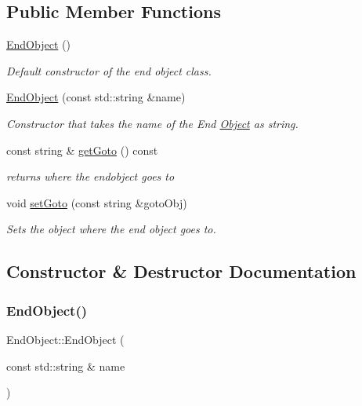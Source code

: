 \subsection*{Public Member Functions}
\begin{DoxyCompactItemize}
\item 
\mbox{\label{classEndObject_a3efa8c64e8a441d9a455cee8e0acf3cc}} 
\hyperlink{classEndObject_a3efa8c64e8a441d9a455cee8e0acf3cc}{End\+Object} ()
\begin{DoxyCompactList}\small\item\em Default constructor of the end object class. \end{DoxyCompactList}\item 
\hyperlink{classEndObject_a2b7de61a785ee056d8ee82cb7e545b95}{End\+Object} (const std\+::string \&name)
\begin{DoxyCompactList}\small\item\em Constructor that takes the name of the End \hyperlink{classObject}{Object} as string. \end{DoxyCompactList}\item 
const string \& \hyperlink{classEndObject_a24ff73b898d1fa9fa15b98f490bf6bbc}{get\+Goto} () const
\begin{DoxyCompactList}\small\item\em returns where the endobject goes to \end{DoxyCompactList}\item 
void \hyperlink{classEndObject_af2fd8ca8246a6891f72f44aacd55cba4}{set\+Goto} (const string \&goto\+Obj)
\begin{DoxyCompactList}\small\item\em Sets the object where the end object goes to. \end{DoxyCompactList}\end{DoxyCompactItemize}


\subsection{Constructor \& Destructor Documentation}
\mbox{\label{classEndObject_a2b7de61a785ee056d8ee82cb7e545b95}} 
\subsubsection{\texorpdfstring{End\+Object()}{EndObject()}}
{\footnotesize\ttfamily End\+Object\+::\+End\+Object (\begin{DoxyParamCaption}\item[{const std\+::string \&}]{name }\end{DoxyParamCaption})\hspace{0.3cm}{\ttfamily [explicit]}}



